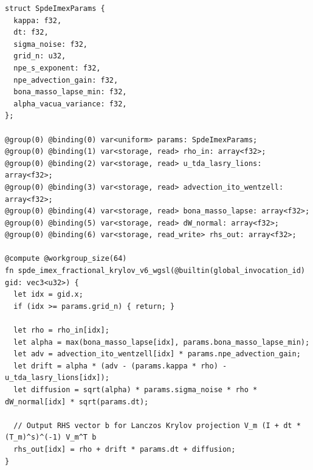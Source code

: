 \documentclass[11pt,a4paper,reqno]{article}
\theoremstyle{plain}
\theoremstyle{definition}
\theoremstyle{remark}
\numberwithin{equation}{section}
\begin{document}
\begin{lstlisting}[style=spdekernel, caption={Version 6.0 (DOI 10.5281/zenodo.23280282): 64x64 WebGPU WGSL Compute Shader with Bona--Mass\'o Lapse and Marolf--Maxfield Alpha-Vacua Noise.}, label={lst:wgsl_imex_v6}]
struct SpdeImexParams {
  kappa: f32,
  dt: f32,
  sigma_noise: f32,
  grid_n: u32,
  npe_s_exponent: f32,
  npe_advection_gain: f32,
  bona_masso_lapse_min: f32,
  alpha_vacua_variance: f32,
};

@group(0) @binding(0) var<uniform> params: SpdeImexParams;
@group(0) @binding(1) var<storage, read> rho_in: array<f32>;
@group(0) @binding(2) var<storage, read> u_tda_lasry_lions: array<f32>;
@group(0) @binding(3) var<storage, read> advection_ito_wentzell: array<f32>;
@group(0) @binding(4) var<storage, read> bona_masso_lapse: array<f32>;
@group(0) @binding(5) var<storage, read> dW_normal: array<f32>;
@group(0) @binding(6) var<storage, read_write> rhs_out: array<f32>;

@compute @workgroup_size(64)
fn spde_imex_fractional_krylov_v6_wgsl(@builtin(global_invocation_id) gid: vec3<u32>) {
  let idx = gid.x;
  if (idx >= params.grid_n) { return; }

  let rho = rho_in[idx];
  let alpha = max(bona_masso_lapse[idx], params.bona_masso_lapse_min);
  let adv = advection_ito_wentzell[idx] * params.npe_advection_gain;
  let drift = alpha * (adv - (params.kappa * rho) - u_tda_lasry_lions[idx]);
  let diffusion = sqrt(alpha) * params.sigma_noise * rho * dW_normal[idx] * sqrt(params.dt);

  // Output RHS vector b for Lanczos Krylov projection V_m (I + dt * (T_m)^s)^(-1) V_m^T b
  rhs_out[idx] = rho + drift * params.dt + diffusion;
}
\end{lstlisting}
\end{document}
